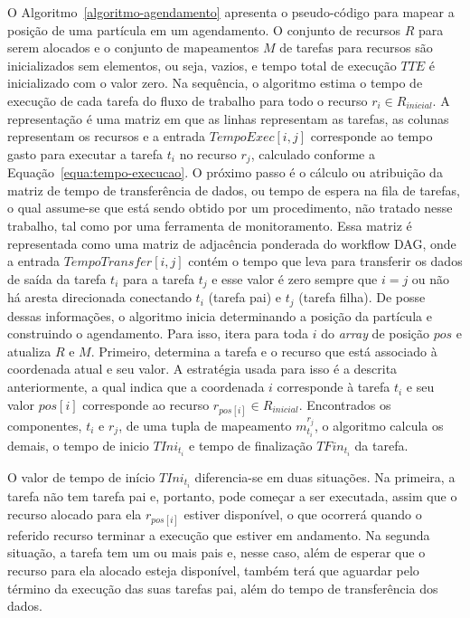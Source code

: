 O Algoritmo~\ref{algoritmo-agendamento} apresenta o pseudo-código para mapear a posição de uma partícula em um agendamento. O conjunto de recursos $R$ para serem alocados e o conjunto de mapeamentos $M$ de tarefas para recursos são inicializados sem elementos, ou seja, vazios, e tempo total de execução $TTE$ é inicializado com o valor zero. Na sequência, o algoritmo estima o tempo de execução de cada tarefa do fluxo de trabalho para todo o recurso ${r_i} \in {R_{inicial}}$. A representação é uma matriz em que as linhas representam as tarefas, as colunas representam os recursos e a entrada $ TempoExec[i,j] $ corresponde ao tempo gasto para executar a tarefa $t_i$ no recurso $r_j$, calculado conforme a Equação~\ref{equa:tempo-execucao}. O próximo passo é o cálculo ou atribuição da matriz de tempo de transferência de dados, ou tempo de espera na fila de tarefas, o qual assume-se que está sendo obtido por um procedimento, não tratado nesse trabalho, tal como por uma ferramenta de monitoramento. Essa matriz é representada como uma matriz de adjacência ponderada do workflow DAG, onde a entrada $ TempoTransfer[i, j]$ contém o tempo que leva para transferir os dados de saída da tarefa $t_i$ para a tarefa $t_j$ e esse valor é zero sempre que $i =j$ ou não há aresta direcionada conectando $t_i$ (tarefa pai) e $t_j$ (tarefa filha). 
De posse dessas informações, o algoritmo inicia determinando a posição da partícula e construindo o agendamento. Para isso, itera para toda $ i $ do \textit{array} de posição $pos$ e atualiza $ R $ e $ M $. Primeiro, determina a tarefa e o recurso que está associado à coordenada atual e seu valor. A estratégia usada para isso é a descrita anteriormente, a qual indica que a coordenada $ i $ corresponde à tarefa $t_i$ e seu valor $pos[i]$ corresponde ao recurso $  {r_{pos[i]}} \in {R_{inicial}} $. Encontrados os componentes, $ {t_i} $ e $ {r_j} $, de uma tupla de mapeamento $ m_{{t_i}}^{{r_j}} $, o algoritmo calcula os demais, o tempo de inicio $ TIn{i_{{t_i}}} $ e tempo de finalização $TFi{n_{{t_i}}}$ da tarefa.

O valor de tempo de início $ TIn{i_{{t_i}}} $ diferencia-se em duas situações. Na primeira, a tarefa não tem tarefa pai e, portanto, pode começar a ser executada, assim que o recurso alocado para ela $r_{pos[i]}$ estiver disponível, o que ocorrerá quando o referido recurso terminar a execução que estiver em andamento. Na segunda situação, a tarefa tem um ou mais pais e, nesse caso, além de esperar que o recurso para ela alocado esteja disponível, também terá que aguardar pelo término da execução das suas tarefas pai, além do tempo de transferência dos dados.


